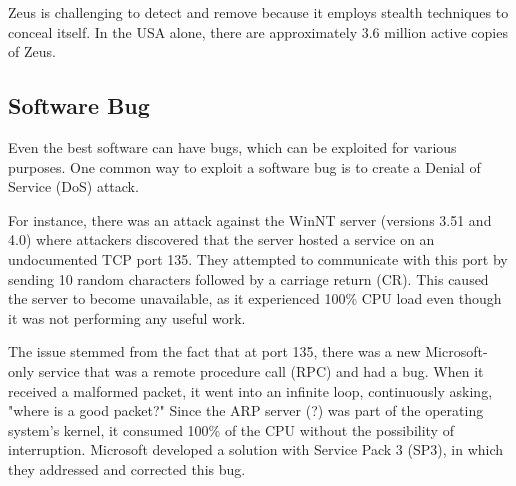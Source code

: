 Zeus is challenging to detect and remove because it employs stealth techniques to conceal itself. In the USA alone, there are approximately 3.6 million active copies of Zeus.


\subsection{Software Bug}
Even the best software can have bugs, which can be exploited for various purposes. One common way to exploit a software bug is to create a Denial of Service (DoS) attack.

For instance, there was an attack against the WinNT server (versions 3.51 and 4.0) where attackers discovered that the server hosted a service on an undocumented TCP port 135. They attempted to communicate with this port by sending 10 random characters followed by a carriage return (CR). This caused the server to become unavailable, as it experienced 100\% CPU load even though it was not performing any useful work.

The issue stemmed from the fact that at port 135, there was a new Microsoft-only service that was a remote procedure call (RPC) and had a bug. When it received a malformed packet, it went into an infinite loop, continuously asking, "where is a good packet?" Since the ARP server (?) was part of the operating system's kernel, it consumed 100\% of the CPU without the possibility of interruption. Microsoft developed a solution with Service Pack 3 (SP3), in which they addressed and corrected this bug.

